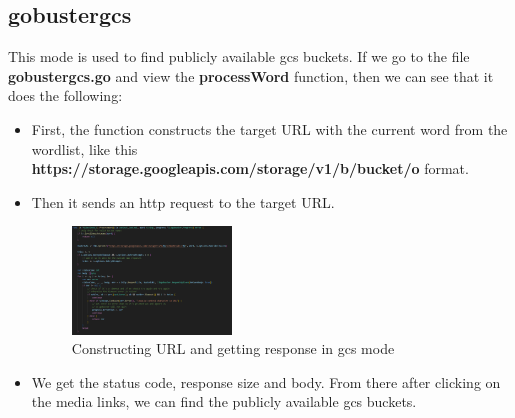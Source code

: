\documentclass[12 pt]{article}
\begin{document}
\subsection{gobustergcs}
This mode is used to find publicly available gcs buckets. If we go to the file \textbf{gobustergcs.go} and view the \textbf{processWord} function, then we can see that it does the following:
\begin{itemize}
    \item First, the function constructs the target URL with the current word from the wordlist, like this \textbf{https://storage.googleapis.com/storage/v1/b/bucket/o} format.
    \item Then it sends an http request to the target URL.
    \begin{figure}[!htbp]
        \centering
        \includegraphics[width=0.4\textwidth]{Gobustergcs_processWord.png}
        \caption{Constructing URL and getting response in gcs mode}
        \label{fig: Gobustergcs processWord}
    \end{figure}
    \item We get the status code, response size and body. From there after clicking on the media links, we can find the publicly available gcs buckets.
\end{itemize}
\end{document}
